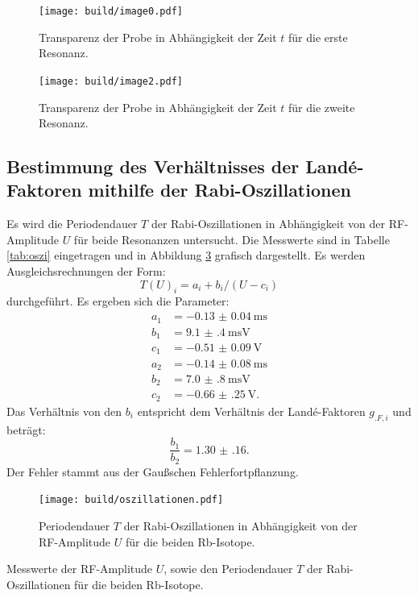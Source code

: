 \begin{figure}
	\centering
	\texttt{[image: build/image0.pdf]}
	\caption{Transparenz der Probe in Abhängigkeit der Zeit $t$ für die erste Resonanz.}
	\label{fig:messung2a}
\end{figure}

\begin{figure}
	\centering
	\texttt{[image: build/image2.pdf]}
	\caption{Transparenz der Probe in Abhängigkeit der Zeit $t$ für die zweite Resonanz.}
	\label{fig:messung2b}
\end{figure}

\subsection{Bestimmung des Verhältnisses der Landé-Faktoren mithilfe der Rabi-Oszillationen}

Es wird die Periodendauer $T$ der Rabi-Oszillationen in Abhängigkeit von der RF-Amplitude $U$ für beide Resonanzen untersucht. Die Messwerte sind in Tabelle \ref{tab:oszi} eingetragen und in Abbildung \ref{fig:oszi} grafisch dargestellt.
Es werden Ausgleichsrechnungen der Form:
\[
T(U)_i = a_i+b_i/(U-c_i)
\] 
durchgeführt. Es ergeben sich die Parameter:
\begin{align*}
a_1 &= \SI{-0.13(4)}{\milli\second}\\
b_1 &= \SI{9.1(4)}{\milli\second\volt}\\
c_1 &= \SI{-0.51(9)}{\volt}\\
a_2 &= \SI{-0.14(8)}{\milli\second}\\
b_2 &= \SI{7.0(8)}{\milli\second\volt}\\
c_2 &= \SI{-0.66(25)}{\volt}\text{.}
\end{align*}
Das Verhältnis von den $b_i$ entspricht dem Verhältnis der Landé-Faktoren $g_{.F,i}$ und beträgt:
\[
\frac{b_1}{b_2}=\num{1.30(16)}\text{.}
\]
Der Fehler stammt aus der Gaußschen Fehlerfortpflanzung.

\begin{figure}
	\centering
	\texttt{[image: build/oszillationen.pdf]}
	\caption{Periodendauer $T$ der Rabi-Oszillationen in Abhängigkeit von der RF-Amplitude $U$ für die beiden Rb-Isotope.}
	\label{fig:oszi}
\end{figure}

\begin{table}
	\centering
	\caption{Messwerte der RF-Amplitude $U$, sowie den Periodendauer $T$ der Rabi-Oszillationen für die beiden Rb-Isotope.}
	
	\label{tab:oszi}
\end{table}